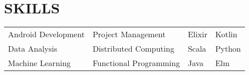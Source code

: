\documentclass[10pt]{article}
\begin{document}
\section*{SKILLS}
				\setlength{\columnsep}{1pt}
				\begin{tabu}{X[2c]X[2c]X[c]X[c]}
					Android Development  & Project Management & Elixir& Kotlin \\
					Data Analysis 			   & Distributed Computing & Scala & Python \\
					Machine Learning		   & Functional Programming & Java & Elm \\
				\end{tabu}
 
\end{document}
